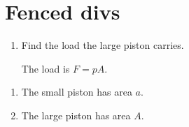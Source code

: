 \section{Fenced divs}

\begin{enumerate}
  \item Find the load the large piston carries.

  \begin{solution}
  The load is $F = pA$.
  \end{solution}
\end{enumerate}

\begin{solution}
\begin{enumerate}
  \item The small piston has area $a$.
  \item The large piston has area $A$.
\end{enumerate}
\end{solution}

